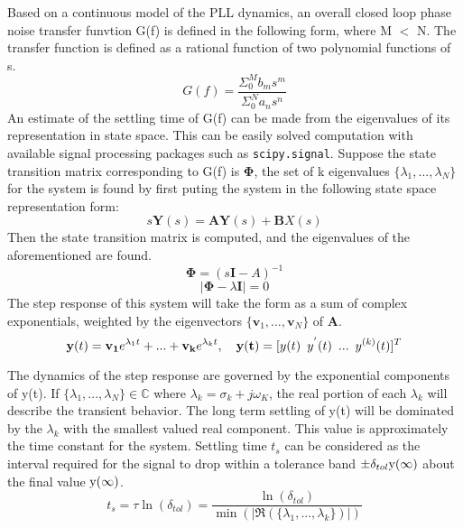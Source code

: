 	Based on a continuous model of the PLL dynamics, an overall closed loop phase noise transfer funvtion G(f) is defined in the following form, where M $<$ N. The transfer function is defined as a rational function of two polynomial functions of s. 
	\begin{equation}
	G(f) = \frac{\Sigma_0^M b_ms^m}{\Sigma_0^N a_ns^n}
	\end{equation}
		An estimate of the settling time of G(f) can be made from the eigenvalues of its  representation in state space. This can be easily solved computation with available signal processing packages such as \texttt{scipy.signal}. Suppose the state transition matrix corresponding to G(f) is $\mathbf{\Phi}$, the set of k eigenvalues $\{\lambda_1, ... , \lambda_{N}\}$ for the system is found by first puting the system in the following state space representation form:
	\begin{equation}
		s\mathbf{Y}(s) = \mathbf{AY}(s) +\mathbf{B}X(s)
	\end{equation}
		Then the state transition matrix is computed, and the eigenvalues of the aforementioned are found.
	\begin{equation}
		\mathbf{\Phi} = (s\mathbf{I}-A)^{-1}
	\end{equation}
	\begin{equation}
		|\mathbf{\Phi} - \lambda \mathbf{I}| = 0
	\end{equation}
		The step response of this system will take the form as a sum of complex exponentials, weighted by the eigenvectors $\{\mathbf{v}_1, ... , \mathbf{v}_N\}$ of $\mathbf{A}$.
	\begin{equation}
		\mathbf{y}(t) = \mathbf{v_1}e^{\lambda_1t} + ... + \mathbf{v_k}e^{\lambda_kt}, \hspace{1em} \mathbf{y(t)} = [ y(t) \hspace{0.5em}y^{'}(t)\hspace{0.5em} ...\hspace{0.5em} y^{(k)}(t)]^T
	\end{equation}

	The dynamics of the step response are governed by the exponential components of y(t). If  $\{\lambda_1, ... , \lambda_N\} \in \mathds{C}$ where $\lambda_k=\sigma_k+j\omega_K$, the real portion of each $\lambda_k$ will describe the transient behavior. The long term settling of y(t) will be dominated by the $\lambda_k$ with the smallest valued real component. This value is approximately the time constant for the system. Settling time $t_s$ can be considered as the interval required for the signal to drop within a tolerance band $\pm \delta_{tol} \textnormal{y}(\infty)$ about the final value $\textnormal{y}(\infty)$. 
	\begin{equation}
		t_s = \tau\ln(\delta_{tol}) = \frac{\ln(\delta_{tol})}{\min(|\Re(\{\lambda_1, ... , \lambda_k\})|)}
	\end{equation}

